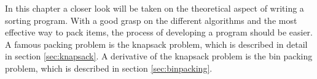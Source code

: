 In this chapter a closer look will be taken on the theoretical aspect of writing a sorting program.
With a good grasp on the different algorithms and the most effective way to pack items, the process of developing a program should be easier. A famous packing problem is the knapsack problem, which is described in detail in section \ref{sec:knapsack}. A derivative of the knapsack problem is the bin packing problem, which is described in section \ref{sec:binpacking}.